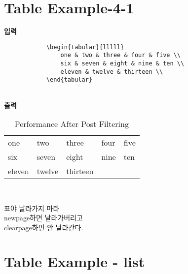 \documentclass[12pt,a4paper]{report}
\begin{document}
\clearpage
\section{Table Example-4-1}

	\singlespacing
	\textbf{입력}\\
		\begin{boxedminipage}[t]{1.0\linewidth}
		\small
		\begin{verbatim}	
			\begin{tabular}{lllll}
				one & two & three & four & five \\
				six & seven & eight & nine & ten \\
				eleven & twelve & thirteen \\
			\end{tabular} 
		\end{verbatim} 
		\end{boxedminipage} \\

		\textbf{출력}\\
		
		\vspace{-2.0em}
		\begin{table}[h]
			\centering 
			\caption{Performance After Post Filtering}
			\begin{tabular}{l l l l l}
				\hline
				one & two & three & four & five \\
				six & seven & eight & nine & ten \\
				eleven & twelve & thirteen \\
				\hline
			\end{tabular} \\
		\end{table}
		
	\doublespacing
		
	표야 날라가지 마라 	\\
	newpage하면 날라가버리고\\
	clearpage하면 안 날라간다.\\
	
	
\clearpage
\section{Table Example - list }
	
\end{document}

